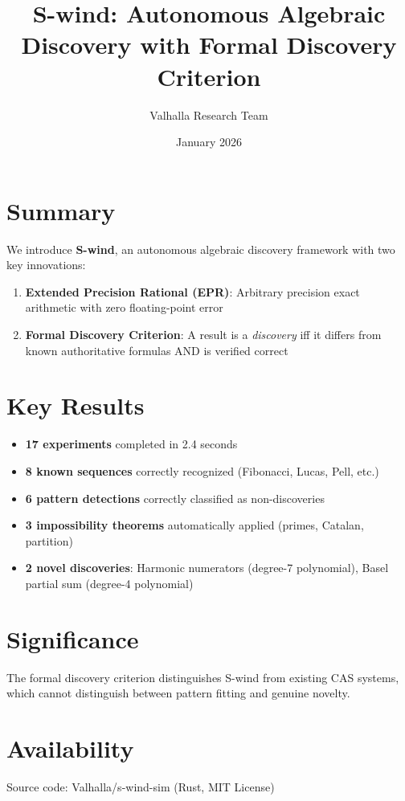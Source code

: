 \documentclass[11pt]{article}
\title{S-wind: Autonomous Algebraic Discovery with Formal Discovery Criterion}
\author{Valhalla Research Team}
\date{January 2026}
\begin{document}
\maketitle

\section*{Summary}

We introduce \textbf{S-wind}, an autonomous algebraic discovery framework with two key innovations:

\begin{enumerate}
    \item \textbf{Extended Precision Rational (EPR)}: Arbitrary precision exact arithmetic with zero floating-point error
    \item \textbf{Formal Discovery Criterion}: A result is a \emph{discovery} iff it differs from known authoritative formulas AND is verified correct
\end{enumerate}

\section*{Key Results}

\begin{itemize}
    \item \textbf{17 experiments} completed in 2.4 seconds
    \item \textbf{8 known sequences} correctly recognized (Fibonacci, Lucas, Pell, etc.)
    \item \textbf{6 pattern detections} correctly classified as non-discoveries
    \item \textbf{3 impossibility theorems} automatically applied (primes, Catalan, partition)
    \item \textbf{2 novel discoveries}: Harmonic numerators (degree-7 polynomial), Basel partial sum (degree-4 polynomial)
\end{itemize}

\section*{Significance}

The formal discovery criterion distinguishes S-wind from existing CAS systems, which cannot distinguish between pattern fitting and genuine novelty.

\section*{Availability}

Source code: Valhalla/s-wind-sim (Rust, MIT License)
\end{document}
